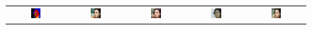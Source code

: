 \begin{figure}[]
\begin{tabular} {cc|cc|c}

\includegraphics[width=0.1932\textwidth]{Images/Rec/Faces/label/28181.png} & \includegraphics[width=0.1932\textwidth]{Images/Rec/Faces/gt/28181.jpg} &
\includegraphics[width=0.1932\textwidth]{Images/Rec/Faces/pix2pixhd/28181.jpg}&
\includegraphics[width=0.1932\textwidth]{Images/Rec/Faces/spade/28181.jpg} &  \includegraphics[width=0.1932\textwidth]{Images/Rec/Faces/ours/28181.png} \\



\end{tabular}
\end{figure}
